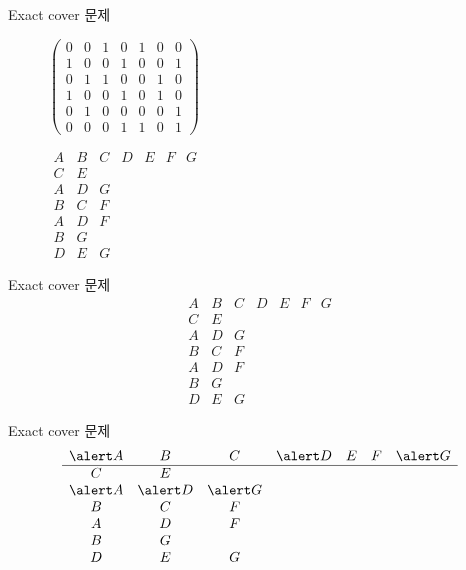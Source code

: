 \documentclass{beamer}
\begin{document}
\begin{frame}{Exact cover 문제}
  \centering
  \begin{figure}[!htb]
    \begin{minipage}{.6\textwidth}
      \centering
      $\left(\begin{array}{ccccccc}
    0&0&1&0&1&0&0\\
    1&0&0&1&0&0&1\\
    0&1&1&0&0&1&0\\
    1&0&0&1&0&1&0\\
    0&1&0&0&0&0&1\\
    0&0&0&1&1&0&1
  \end{array}\right)$
    \end{minipage}%
    \begin{minipage}{.4\textwidth}
      \centering
  $
  \begin{array}{ccccccc}
    A & B & C & D & E & F & G\\
    \hline
    C & E &&&&&\\
    A & D & G &&&&\\
    B & C & F &&&&\\
    A & D & F &&&&\\
    B & G &&&&&\\
    D & E & G &&&&
  \end{array}
  $
    \end{minipage}
\end{figure}
\end{frame}

\renewcommand\arraystretch{1.3}

%
\begin{frame}{Exact cover 문제} 
  $$
  \begin{array}{ccccccc}
    A & B & C & D & E & F & G\\
    \hline
    C & E &&&&&\\
    A & D & G &&&&\\
    B & C & F &&&&\\
    A & D & F &&&&\\
    B & G &&&&&\\
    D & E & G &&&&
  \end{array}
  $$
\end{frame}

%
\begin{frame}{Exact cover 문제} 
  $$
  \begin{array}{ccccccc}
    \alert A & B & C & \alert D & E & F & \alert G\\
    \hline
    C & E &&&&&\\
    \alert A & \alert D & \alert G &&&&\\
    B & C & F &&&&\\
    A & D & F &&&&\\
    B & G &&&&&\\
    D & E & G &&&&
  \end{array}
  $$
\end{frame}
\end{document}
